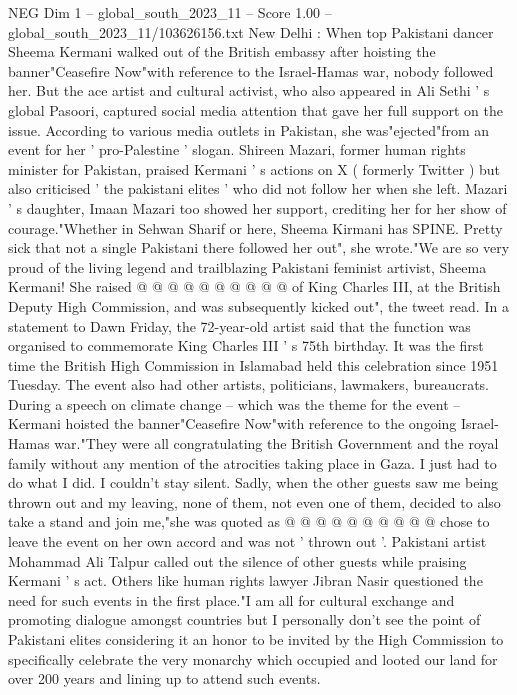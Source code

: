 \begin{textsample}{NEG Dim 1 – global\_south\_2023\_11 – Score 1.00 – global\_south\_2023\_11/103626156.txt}  \label{ex:f1_neg_328}
New Delhi : When top Pakistani dancer Sheema Kermani walked out of the British embassy after hoisting the banner"Ceasefire Now"with reference to the Israel-Hamas war, nobody followed her.
But the ace artist and cultural activist, who also appeared in Ali Sethi ' s global Pasoori, captured social media attention that gave her full support on the issue.
According to various media outlets in Pakistan, she was"ejected"from an event for her ' pro-Palestine ' slogan.
Shireen Mazari, former human rights minister for Pakistan, praised Kermani ' s actions on X ( formerly Twitter ) but also criticised ' the pakistani elites ' who did not follow her when she left.
Mazari ' s daughter, Imaan Mazari too showed her support, crediting her for her show of courage."Whether in Sehwan Sharif or here, Sheema Kirmani has SPINE.
Pretty sick that not a single Pakistani there followed her out", she wrote."We are so very proud of the living legend and trailblazing Pakistani feminist artivist, Sheema Kermani!
She raised @ @ @ @ @ @ @ @ @ @ of King Charles III, at the British Deputy High Commission, and was subsequently kicked out", the tweet read.
In a statement to Dawn Friday, the 72-year-old artist said that the function was organised to commemorate King Charles III ' s 75th birthday.
It was the first time the British High Commission in Islamabad held this celebration since 1951 Tuesday.
The event also had other artists, politicians, lawmakers, bureaucrats.
During a speech on climate change -- which was the theme for the event -- Kermani hoisted the banner"Ceasefire Now"with reference to the ongoing Israel-Hamas war."They were all congratulating the British Government and the royal family without any mention of the atrocities taking place in Gaza.
I just had to do what I did.
I couldn't stay silent.
Sadly, when the other guests saw me being thrown out and my leaving, none of them, not even one of them, decided to also take a stand and join me,"she was quoted as @ @ @ @ @ @ @ @ @ @ chose to leave the event on her own accord and was not ' thrown out '.
Pakistani artist Mohammad Ali Talpur called out the silence of other guests while praising Kermani ' s act.
Others like human rights lawyer Jibran Nasir questioned the need for such events in the first place."I am all for cultural exchange and promoting dialogue amongst countries but I personally don't see the point of Pakistani elites considering it an honor to be invited by the High Commission to specifically celebrate the very monarchy which occupied and looted our land for over 200 years and lining up to attend such events.

\end{textsample}

